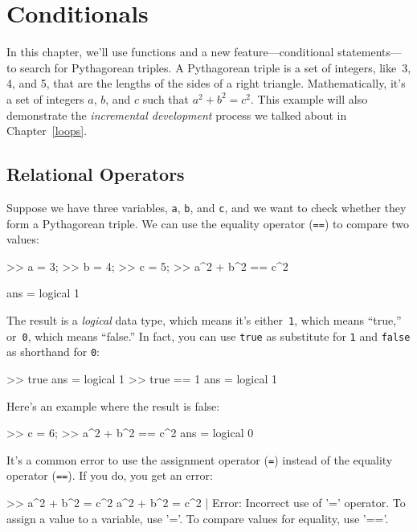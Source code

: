 \documentclass[../../book.tex]{subfiles}
\begin{document}
\chapter{Conditionals}


In this chapter, we'll use functions and a new feature---conditional statements---to search for Pythagorean triples.
A Pytha\-gorean triple is a set of integers, like~3, 4, and 5,
that are the lengths of the sides of a right triangle.  Mathematically, it's a set of integers $a$, $b$, and $c$ such that $a^2 + b^2 = c^2$.
This example will also demonstrate the \emph{incremental development} process we talked about in Chapter~\ref{loops}.


\section{Relational Operators}

Suppose we have three variables, \lstinline{a}, \lstinline{b}, and \lstinline{c}, and we want to check whether they form a Pythagorean triple.  We can use the equality operator (\lstinline{==}) to compare two values:

\begin{code}
>> a = 3;
>> b = 4;
>> c = 5;
>> a^2 + b^2 == c^2

ans = logical 1
\end{code}

The result is a \emph{logical} data type, which means it's either~\lstinline{1}, which means ``true,'' or~\lstinline{0}, which means ``false.''  In fact, you can use \lstinline{true} as substitute for \lstinline{1} and \lstinline{false} as shorthand for \lstinline{0}:
\begin{code}
    >> true
    ans =
      logical
       1
    >> true == 1
    ans =
      logical
       1
\end{code}


Here's an example where the result is false:

\begin{code}
>> c = 6;
>> a^2 + b^2 == c^2
ans = logical 0
\end{code}

It's a common error to use the assignment operator (\lstinline{=}) instead of the equality operator (\lstinline{==}).  If you do, you get an error:

\begin{code}
>> a^2 + b^2 = c^2
 a^2 + b^2 = c^2
           |
Error: Incorrect use of '=' operator.
To assign a value to a variable, use '='.
To compare values for equality, use '=='.
\end{code}
\end{document}
